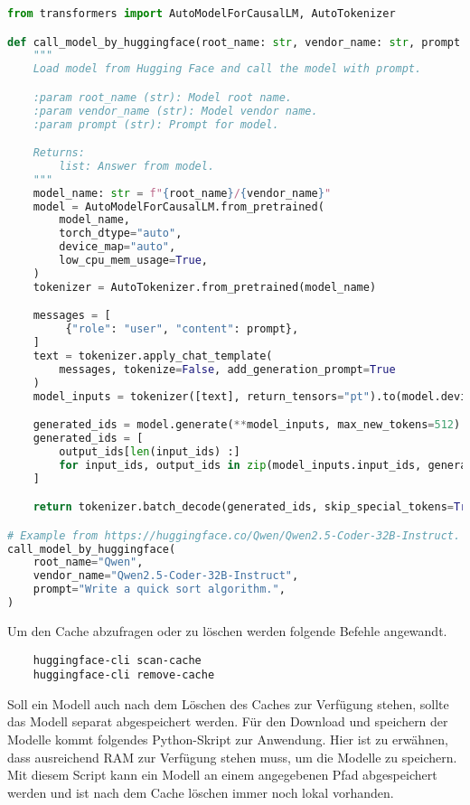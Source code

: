 \begin{lstlisting}[language=python,caption={Laden der Modelle von Hugging Face und lokal 
speichern},label=lst:download_hugging_face_model_by_cache]
from transformers import AutoModelForCausalLM, AutoTokenizer

def call_model_by_huggingface(root_name: str, vendor_name: str, prompt: str) -> list:
    """
    Load model from Hugging Face and call the model with prompt.

    :param root_name (str): Model root name.
    :param vendor_name (str): Model vendor name.
    :param prompt (str): Prompt for model.

    Returns:
        list: Answer from model.
    """
    model_name: str = f"{root_name}/{vendor_name}"
    model = AutoModelForCausalLM.from_pretrained(
        model_name,
        torch_dtype="auto",
        device_map="auto",
        low_cpu_mem_usage=True,
    )
    tokenizer = AutoTokenizer.from_pretrained(model_name)

    messages = [
         {"role": "user", "content": prompt},
    ]
    text = tokenizer.apply_chat_template(
        messages, tokenize=False, add_generation_prompt=True
    )
    model_inputs = tokenizer([text], return_tensors="pt").to(model.device)

    generated_ids = model.generate(**model_inputs, max_new_tokens=512)
    generated_ids = [
        output_ids[len(input_ids) :]
        for input_ids, output_ids in zip(model_inputs.input_ids, generated_ids)
    ]

    return tokenizer.batch_decode(generated_ids, skip_special_tokens=True)

# Example from https://huggingface.co/Qwen/Qwen2.5-Coder-32B-Instruct.
call_model_by_huggingface(
    root_name="Qwen",
    vendor_name="Qwen2.5-Coder-32B-Instruct",
    prompt="Write a quick sort algorithm.",
)
\end{lstlisting}

Um den Cache abzufragen oder zu löschen werden folgende Befehle angewandt.

\begin{verbatim}
	huggingface-cli scan-cache
	huggingface-cli remove-cache
\end{verbatim}

Soll ein Modell auch nach dem Löschen des Caches zur Verfügung stehen, sollte das Modell separat abgespeichert werden. Für den Download und speichern der Modelle kommt folgendes Python-Skript zur Anwendung. Hier ist zu erwähnen, dass ausreichend RAM zur Verfügung stehen muss, um die Modelle zu speichern. Mit diesem Script kann ein Modell an einem angegebenen Pfad abgespeichert werden und ist nach dem Cache löschen immer noch lokal vorhanden.

